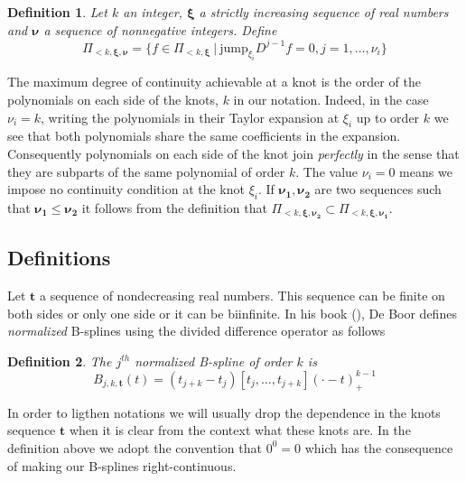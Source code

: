 \documentclass[a4paper, 11pt]{article}
\newtheorem{deftn}{Definition}
\begin{document}
\begin{deftn}
  Let $k$ an integer, $\bm{\xi}$ a strictly increasing sequence of real numbers and $\bm{\nu}$ a sequence of nonnegative 
  integers. Define
  \begin{equation}
    \Pi_{<k, \bm{\xi}, \bm{\nu}} = \{f \in \Pi_{<k, \bm{\xi}} \ | \ \text{jump}_{\xi_i} D^{j-1}f = 0, j=1, \ldots, 
    \nu_i\}
  \end{equation}
\end{deftn}

The maximum degree of continuity achievable at a knot is the order of the polynomials on each side of the knots, $k$ in 
our notation. Indeed, in the case $\nu_i = k$, writing the polynomials in their Taylor expansion at $\xi_i$ up to order 
$k$ we see that both polynomials share the same coefficients in the expansion. Consequently polynomials on each side of 
the knot join \emph{perfectly} in the sense that they are subparts of the same polynomial of order $k$. The value 
$\nu_i=0$ means we impose no continuity condition at the knot $\xi_i$.  If $\bm{\nu_1}, \bm{\nu_2}$ are two sequences 
such that $\bm{\nu_1} \leq \bm{\nu_2}$ it follows from the definition that $\Pi_{<k, \bm{\xi}, \bm{\nu_2}} \subset 
\Pi_{<k, \bm{\xi}, \bm{\nu_1}}$.

\subsection{Definitions}

Let $\bm{t}$ a sequence of nondecreasing real numbers. This sequence can be finite on both sides or only one side or it 
can be biinfinite. In his book (\cite{Bo01}), De Boor defines \emph{normalized} B-splines using the divided difference 
operator as follows

\begin{deftn}
  The $j^{th}$ \emph{normalized} B-spline of order $k$ is
  \begin{equation}
    B_{j, k, \bm{t}}(t) = (t_{j+k}-t_j)[t_j, \ldots, t_{j+k}]{(\cdot-t)}_+^{k-1}
  \end{equation}
\end{deftn}

In order to ligthen notations we will usually drop the dependence in the knots sequence $\bm{t}$ when it is clear from 
the context what these knots are. In the definition above we adopt the convention that $0^0 = 0$ which has the 
consequence of making our B-splines right-continuous.
\end{document}
